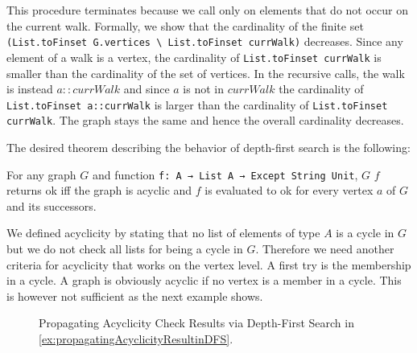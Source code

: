 This procedure terminates because we call \dfsstep only on elements that do not occur on the current walk. Formally, we show that the cardinality of the finite set \lstinline|(List.toFinset G.vertices \ List.toFinset currWalk)| decreases. Since any element of a walk is a vertex, the cardinality of \lstinline|List.toFinset currWalk| is smaller than the cardinality of the set of vertices. In the recursive calls, the walk is instead $a::currWalk$ and since $a$ is not in $currWalk$ the cardinality of \lstinline|List.toFinset a::currWalk| is larger than the cardinality of \lstinline|List.toFinset currWalk|. The graph stays the same and hence the overall cardinality decreases.

The desired theorem describing the behavior of depth-first search is the following:

\begin{theorem}[\dfssemantics]\label{trm:dfssemantics}
    For any graph $G$ and function \lstinline|f: A → List A → Except String Unit|, \dfs $G$ $f$ returns ok iff the graph is acyclic and $f$ is evaluated to ok for every vertex $a$ of $G$ and its successors.
\end{theorem}

We defined acyclicity by stating that no list of elements of type $A$ is a cycle in $G$ but we do not check all lists for being a cycle in $G$. Therefore we need another criteria for acyclicity that works on the vertex level. A first try is the membership in a cycle. A graph is obviously acyclic if no vertex is a member in a cycle. This is however not sufficient as the next example shows.

\begin{figure}
  \center
  \caption{Propagating Acyclicity Check Results via Depth-First Search in \cref{ex:propagatingAcyclicityResultinDFS}.}\label{fig:propagatingAcyclicityResultinDFS}
\end{figure}

